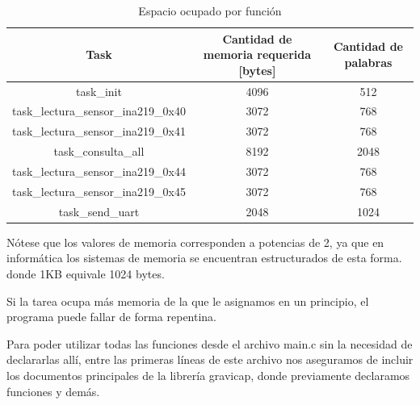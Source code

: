                     \begin{table}[H]
                        \centering
                        \begin{tabular}{|c|c|c|}
                        \hline
                             Task & Cantidad de memoria requerida [bytes] & Cantidad de palabras\\
                        \hline
                             task\_init & 4096 & 512\\
                        \hline
                            task\_lectura\_sensor\_ina219\_0x40 & 3072 & 768\\
                        \hline
                            task\_lectura\_sensor\_ina219\_0x41 & 3072 & 768\\ 
                        \hline
                            task\_consulta\_all & 8192 & 2048\\
                        \hline
                            task\_lectura\_sensor\_ina219\_0x44 & 3072 & 768\\
                        \hline
                            task\_lectura\_sensor\_ina219\_0x45 & 3072 & 768\\ 
                        \hline
                            task\_send\_uart & 2048 & 1024\\
                        \hline
                        \end{tabular}
                        \caption{Espacio ocupado por función}
                        \label{tab:s9}
                    \end{table}

                    Nótese que los valores de memoria corresponden a potencias de 2, ya que en informática los sistemas de memoria se encuentran estructurados de esta forma. donde 1KB equivale 1024 bytes.\par
                    Si la tarea ocupa más memoria de la que le asignamos en un principio, el programa puede fallar de forma repentina.\par
                    Para poder utilizar todas las funciones desde el archivo main.c sin la necesidad de declararlas allí, entre las primeras líneas de este archivo nos aseguramos de incluir los documentos principales de la librería gravicap, donde previamente declaramos funciones y demás.\par

                    \par

